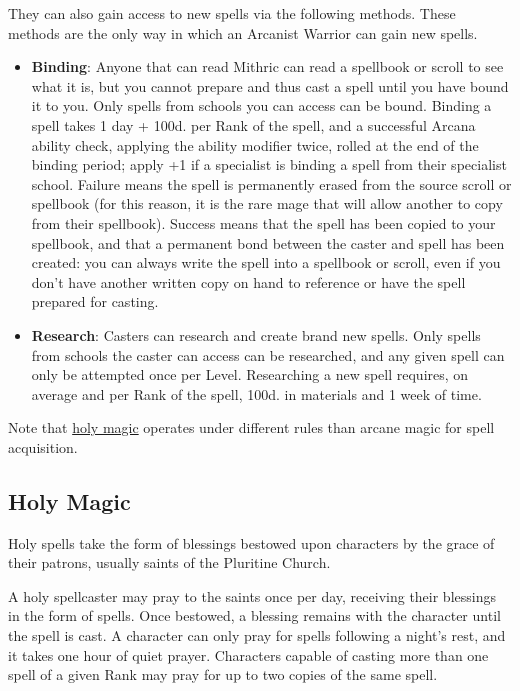 \documentclass{book}
\providecommand{\tightlist}{%
\setlength{\itemsep}{0pt}\setlength{\parskip}{0pt}}
\begin{document}
They can also gain access to new spells via the following methods. These
methods are the only way in which an Arcanist Warrior can gain new
spells.

\begin{itemize}
	\tightlist
	\item
	\textbf{Binding}: Anyone that can read Mithric can read a spellbook or
	scroll to see what it is, but you cannot prepare and thus cast a spell
	until you have bound it to you. Only spells from schools you can
	access can be bound. Binding a spell takes 1 day + 100d. per Rank of
	the spell, and a successful Arcana ability check, applying the ability
	modifier twice, rolled at the end of the binding period; apply +1 if a
	specialist is binding a spell from their specialist school. Failure
	means the spell is permanently erased from the source scroll or
	spellbook (for this reason, it is the rare mage that will allow
	another to copy from their spellbook). Success means that the spell
	has been copied to your spellbook, and that a permanent bond between
	the caster and spell has been created: you can always write the spell
	into a spellbook or scroll, even if you don't have another written
	copy on hand to reference or have the spell prepared for casting.
	\item
	\textbf{Research}: Casters can research and create brand new spells.
	Only spells from schools the caster can access can be researched, and
	any given spell can only be attempted once per Level. Researching a
	new spell requires, on average and per Rank of the spell, 100d. in
	materials and 1 week of time.
\end{itemize}

Note that \hyperref[holy-magic]{holy magic} operates under different
rules than arcane magic for spell acquisition.


\subsection*{Holy Magic}\label{holy-magic}

Holy spells take the form of blessings bestowed upon characters by the
grace of their patrons, usually saints of the Pluritine Church.

A holy spellcaster may pray to the saints once per day, receiving their
blessings in the form of spells. Once bestowed, a blessing remains with
the character until the spell is cast. A character can only pray for
spells following a night's rest, and it takes one hour of quiet prayer.
Characters capable of casting more than one spell of a given Rank may
pray for up to two copies of the same spell.
\end{document}

